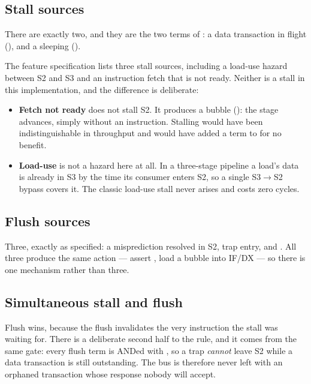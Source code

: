 \subsection{Stall sources}

There are exactly two, and they are the two terms of : a data
transaction in flight (), and a sleeping 
().

The feature specification lists three stall sources, including a load-use hazard
between S2 and S3 and an instruction fetch that is not ready. Neither is a stall
in this implementation, and the difference is deliberate:

\begin{itemize}[nosep]
  \item \textbf{Fetch not ready} does not stall S2. It produces a bubble
        (): the stage
        advances, simply without an instruction. Stalling would have been
        indistinguishable in throughput and would have added a term to
         for no benefit.
  \item \textbf{Load-use} is not a hazard here at all. In a three-stage pipeline a
        load's data is already in S3 by the time its consumer enters S2, so a
        single S3$\to$S2 bypass covers it. The classic load-use stall never
        arises and costs zero cycles.
\end{itemize}

\subsection{Flush sources}

Three, exactly as specified: a misprediction resolved in S2, trap entry, and
. All three produce the same action --- assert , load a
bubble into IF/DX --- so there is one mechanism rather than three.

\subsection{Simultaneous stall and flush}

Flush wins, because the flush invalidates the very instruction the stall was
waiting for. There is a deliberate second half to the rule, and it comes from the
same gate: every flush term is ANDed with , so a trap
\emph{cannot} leave S2 while a data transaction is still outstanding. The bus is
therefore never left with an orphaned transaction whose response nobody will
accept.

